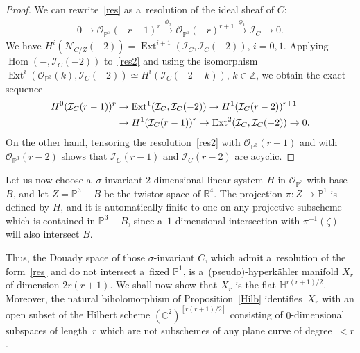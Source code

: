 \documentclass[pdftex]{sigma}
\numberwithin{equation}{section}
\begin{document}
\begin{proof}
We can rewrite~\eqref{res} as a~resolution of the ideal sheaf of $C$:
\begin{gather}
0\to {\mathcal{O}}_{{\mathbb{P}}^3}(-r-1)^r\stackrel{\phi_2}{\longrightarrow} {\mathcal{O}}_{{\mathbb{P}}^3}(-r)^{r+1}
\stackrel{\phi_1}{\longrightarrow} {\mathcal{I}}_C\to 0.
\label{res2}
\end{gather}
We have $H^i({\mathcal{N}}_{C/Z}(-2))=\operatorname{Ext}^{i+1}({\mathcal{I}}_C,{\mathcal{I}}_C(-2))$, $i=0,1$.
Applying $\operatorname{Hom}(-,{\mathcal{I}}_C(-2))$ to~\eqref{res2} and using the isomorphism
$\operatorname{Ext}^i({\mathcal{O}}_{{\mathbb{P}}^3}(k), {\mathcal{I}}_C(-2))\simeq H^i({\mathcal{I}}_C(-2-k))$, $k\in
{\mathbb{Z}}$, we obtain the exact sequence
\begin{gather*}
\begin{split}
& H^0({\mathcal{I}}_C(r-1))^r\to \operatorname{Ext}^1({\mathcal{I}}_C,{\mathcal{I}}_C(-2))\to
H^1({\mathcal{I}}_C(r-2))^{r+1}
\\
& \hphantom{H^0({\mathcal{I}}_C(r-1))^r}{}
\to H^1({\mathcal{I}}_C(r-1))^r\to \operatorname{Ext}^2({\mathcal{I}}_C,{\mathcal{I}}_C(-2))\to 0.
\end{split}
\end{gather*}
On the other hand, tensoring the resolution~\eqref{res2} with $ {\mathcal{O}}_{{\mathbb{P}}^3}(r-1)$ and with $
{\mathcal{O}}_{{\mathbb{P}}^3}(r-2)$ shows that ${\mathcal{I}}_C(r-1)$ and ${\mathcal{I}}_C(r-2)$ are acyclic.
\end{proof}

Let us now choose a~$\sigma$-invariant $2$-dimensional linear system $H$ in ${\mathcal{O}}_{{\mathbb{P}}^3}$ with base
$B$, and let $Z={\mathbb{P}}^3-B$ be the twistor space of ${\mathbb{R}}^4$.
The projection $\pi:Z\to {\mathbb{P}}^1$ is def\/ined by $H$, and it is automatically f\/inite-to-one on any projective
subscheme which is contained in ${\mathbb{P}}^3-B$, since a~$1$-dimensional intersection with $\pi^{-1}(\zeta)$ will
also intersect $B$.

Thus, the Douady space of those $\sigma$-invariant $C$, which admit a~resolution of the form~\eqref{res} and do not
intersect a~f\/ixed ${\mathbb{P}}^1$, is a~(pseudo)-hyperk\"ahler manifold $X_r$ of dimension $2r(r+1)$.
We shall now show that $X_r$ is the f\/lat ${\mathbb{H}}^{r(r+1)/2}$.
Moreover, the natural biholomorphism of Proposition~\ref{Hilb} identif\/ies~$X_r$ with an open subset of the Hilbert
scheme $({\mathbb C}^2)^{[r(r+1)/2]}$ consisting of $0$-dimensional subspaces of length~$r$ which are not subschemes of
any plane curve of degree~${<}r$.
\end{document}
